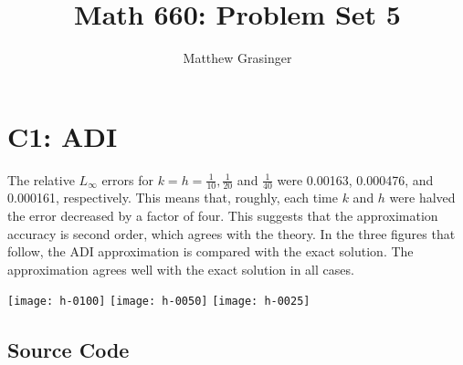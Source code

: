 \documentclass[a4paper,10pt]{article}
\title{Math 660: Problem Set 5}
\author{Matthew Grasinger}
\newcommand{\fw}{\linewidth}
\begin{document}
  \maketitle

	\section{C1: ADI}
	
	The relative $L_\infty$ errors for $k = h = \frac{1}{10}, \frac{1}{20}$ and $\frac{1}{40}$ were 0.00163, 0.000476, and 0.000161, respectively.
	This means that, roughly, each time $k$ and $h$ were halved the error decreased by a factor of four.
	This suggests that the approximation accuracy is second order, which agrees with the theory.
	In the three figures that follow, the ADI approximation is compared with the exact solution.
	The approximation agrees well with the exact solution in all cases.

{
	\centering
	\texttt{[image: h-0100]}
	\vspace{0.25in}
	\texttt{[image: h-0050]}
	\vspace{0.25in}
	\texttt{[image: h-0025]}
	\vspace{0.25in}
}
		
	\subsection{Source Code}
	
	
\end{document}
